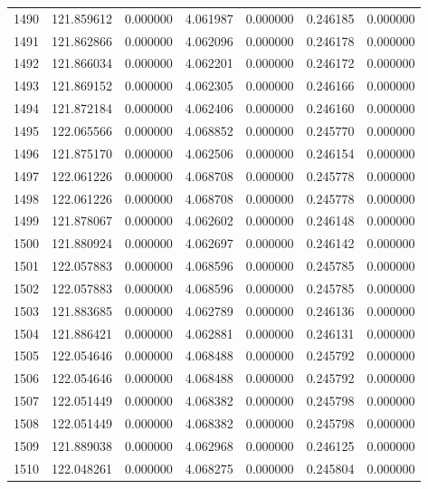 \begin{tabular}{rrrrrrr}
1490 & 121.859612 &    0.000000 &  4.061987 &    0.000000 &    0.246185 &  0.000000 \\
1491 & 121.862866 &    0.000000 &  4.062096 &    0.000000 &    0.246178 &  0.000000 \\
1492 & 121.866034 &    0.000000 &  4.062201 &    0.000000 &    0.246172 &  0.000000 \\
1493 & 121.869152 &    0.000000 &  4.062305 &    0.000000 &    0.246166 &  0.000000 \\
1494 & 121.872184 &    0.000000 &  4.062406 &    0.000000 &    0.246160 &  0.000000 \\
1495 & 122.065566 &    0.000000 &  4.068852 &    0.000000 &    0.245770 &  0.000000 \\
1496 & 121.875170 &    0.000000 &  4.062506 &    0.000000 &    0.246154 &  0.000000 \\
1497 & 122.061226 &    0.000000 &  4.068708 &    0.000000 &    0.245778 &  0.000000 \\
1498 & 122.061226 &    0.000000 &  4.068708 &    0.000000 &    0.245778 &  0.000000 \\
1499 & 121.878067 &    0.000000 &  4.062602 &    0.000000 &    0.246148 &  0.000000 \\
1500 & 121.880924 &    0.000000 &  4.062697 &    0.000000 &    0.246142 &  0.000000 \\
1501 & 122.057883 &    0.000000 &  4.068596 &    0.000000 &    0.245785 &  0.000000 \\
1502 & 122.057883 &    0.000000 &  4.068596 &    0.000000 &    0.245785 &  0.000000 \\
1503 & 121.883685 &    0.000000 &  4.062789 &    0.000000 &    0.246136 &  0.000000 \\
1504 & 121.886421 &    0.000000 &  4.062881 &    0.000000 &    0.246131 &  0.000000 \\
1505 & 122.054646 &    0.000000 &  4.068488 &    0.000000 &    0.245792 &  0.000000 \\
1506 & 122.054646 &    0.000000 &  4.068488 &    0.000000 &    0.245792 &  0.000000 \\
1507 & 122.051449 &    0.000000 &  4.068382 &    0.000000 &    0.245798 &  0.000000 \\
1508 & 122.051449 &    0.000000 &  4.068382 &    0.000000 &    0.245798 &  0.000000 \\
1509 & 121.889038 &    0.000000 &  4.062968 &    0.000000 &    0.246125 &  0.000000 \\
1510 & 122.048261 &    0.000000 &  4.068275 &    0.000000 &    0.245804 &  0.000000 \\

\end{tabular}
